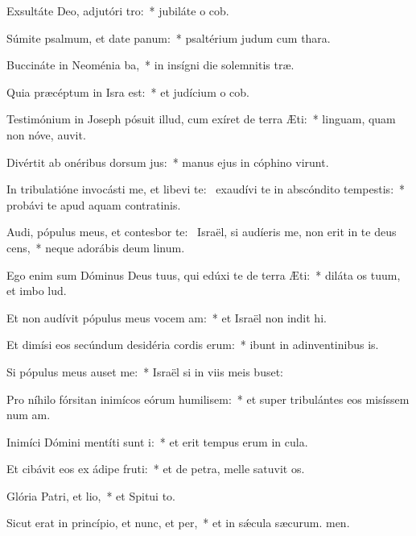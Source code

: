 \item Exsultáte Deo, adjutóri tro:~* jubiláte o cob.
\item Súmite psalmum, et date panum:~* psaltérium judum cum thara.
\item Buccináte in Neoménia ba,~* in insígni die solemnitis træ.
\item Quia præcéptum in Isra est:~* et judícium o cob.
\item Testimónium in Joseph pósuit illud, cum exíret de terra Æti:~* linguam, quam non nóve, auvit.
\item Divértit ab onéribus dorsum jus:~* manus ejus in cóphino virunt.
\item In tribulatióne invocásti me, et libevi te:~\pscross{} exaudívi te in abscóndito tempestis:~* probávi te apud aquam contratinis.
\item Audi, pópulus meus, et contesbor te:~\pscross{} Israël, si audíeris me, non erit in te deus cens,~* neque adorábis deum linum.
\item Ego enim sum Dóminus Deus tuus, qui edúxi te de terra Æti:~* diláta os tuum, et imbo lud.
\item Et non audívit pópulus meus vocem am:~* et Israël non indit hi.
\item Et dimísi eos secúndum desidéria cordis erum:~* ibunt in adinventinibus is.
\item Si pópulus meus auset me:~* Israël si in viis meis buset:
\item Pro níhilo fórsitan inimícos eórum humilisem:~* et super tribulántes eos misíssem num am.
\item Inimíci Dómini mentíti sunt i:~* et erit tempus erum in cula.
\item Et cibávit eos ex ádipe fruti:~* et de petra, melle satuvit os.
\item Glória Patri, et lio,~* et Spitui to.
\item Sicut erat in princípio, et nunc, et per,~* et in sǽcula sæcurum. men.
